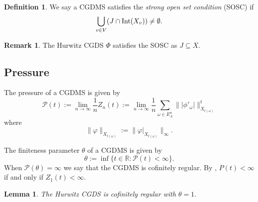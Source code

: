 \documentclass[11pt]{amsart}
\theoremstyle{plain}
\newtheorem{lemma}[theorem]{Lemma}
\theoremstyle{definition}
\newtheorem{definition}[theorem]{Definition}
\newtheorem{remark}[theorem]{Remark}
\renewcommand\~{\tilde}%
\newcommand{\om}{\ensuremath{\omega}}
\newcommand{\cP}{\ensuremath{\mathcal{P}}}
\newcommand{\RR}{\ensuremath{\mathbb R}}%
\numberwithin{equation}{section}
\begin{document}
\begin{definition} We say a CGDMS satisfies the {\it strong open set condition} (SOSC) if
$$
\bigcup_{v\in V}(J\cap {\rm Int} (X_{v})) \neq \emptyset.
$$
\begin{remark}\label{rmk:SOSC}
    The Hurwitz CGDS $\Phi$ satisfies the SOSC as $J\subseteq X$. 
\end{remark}

\end{definition}


\subsection{Pressure}


The pressure of a CGDMS is given by 
$$
    \cP(t):=\lim_{n\to\infty}\frac{1}{n}Z_n(t):=\lim_{n\to\infty}\frac{1}{n}\sum_{\om\in E_A^n}\||\phi'_{\om}|\|^t_{X_{t(\om)}}
$$
where 
$$
    \|\varphi\|_{X_{t(\om)}}:= \|\varphi\vert_{X_{t(\om)}}\|_{\infty}.
$$

The finiteness parameter $\theta$ of a CGDMS is given by 
$$
    \theta:= \inf\{t\in \RR:\cP(t)<\infty\}.
$$
When $\cP(\theta) = \infty$ we say that the CGDMS is cofinitely regular. By \cite[Proposition 19.4.5]{Urbanski22}, $P(t)<\infty$ if and only if $Z_1(t)<\infty$. 


\begin{lemma}\label{lem:cfr}
    The Hurwitz CGDS is cofinitely regular with $\theta = 1$.
\end{lemma} 
\end{document}
